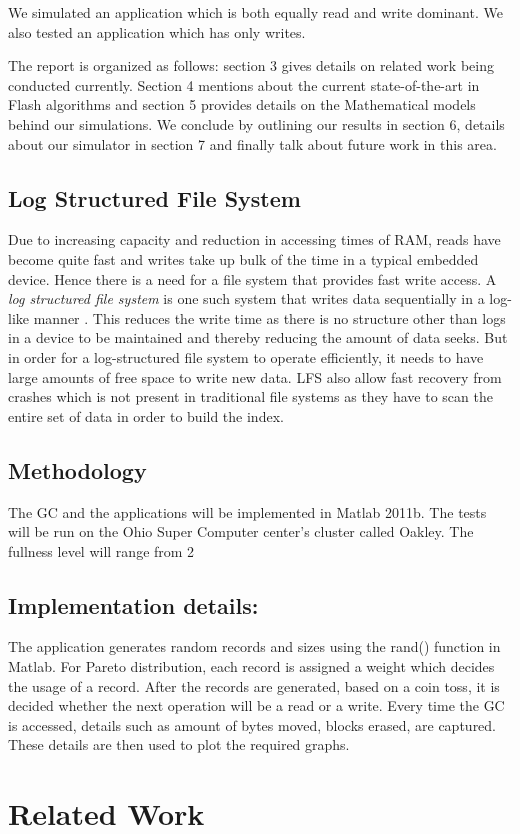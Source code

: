 We simulated an application which is both equally read and write dominant. We also tested an application which has only writes.

The report is organized as follows: section 3 gives details on related work being conducted currently. Section 4 mentions about the current state-of-the-art in Flash algorithms and section 5 provides details on the Mathematical models behind our simulations. We conclude by outlining our results in section 6, details about our simulator in section 7 and finally talk about future work in this area.

\subsection{Log Structured File System}
	Due to increasing capacity and reduction in accessing times of RAM, reads have become quite fast and writes take up bulk of the time in a typical embedded device. Hence there is a need for a file system that provides fast write access. A \emph{log structured file system} is one such system that writes data sequentially in a log-like manner \cite{Rosenblum91}. This reduces the write time as there is no structure other than logs in a device to be maintained and thereby reducing the amount of data seeks. But in order for a log-structured file system to operate efficiently, it needs to have large amounts of free space to write new data. LFS also allow fast recovery from crashes which is not present in traditional file systems as they have to scan the entire set of data in order to build the index.

\subsection{Methodology}
The GC and the applications will be implemented in Matlab 2011b. The tests will be run on the Ohio Super Computer center’s cluster called Oakley. The fullness level will range from 2%

\subsection{Implementation details:}
The application generates random records and sizes using the rand() function in Matlab. For Pareto distribution, each record is assigned a weight which decides the usage of a record. After the records are generated, based on a coin toss, it is decided whether the next operation will be a read or a write. Every time the GC is accessed, details such as amount of bytes moved, blocks erased, are captured. These details are then used to plot the required graphs. 

\section{Related Work}


